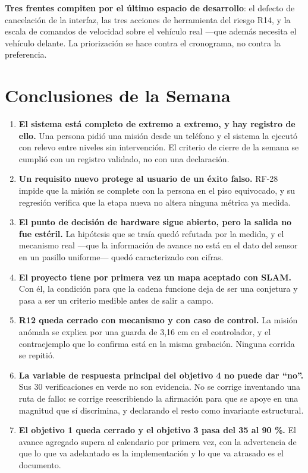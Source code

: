 \documentclass[12pt,letterpaper]{article}
\begin{document}
\textbf{Tres frentes compiten por el último espacio de desarrollo}: el defecto de cancelación de la interfaz, las tres acciones de herramienta del riesgo R14, y la escala de comandos de velocidad sobre el vehículo real ---que además necesita el vehículo delante. La priorización se hace contra el cronograma, no contra la preferencia.

\section{Conclusiones de la Semana}

\begin{enumerate}[leftmargin=*]
    \item \textbf{El sistema está completo de extremo a extremo, y hay registro de ello.} Una persona pidió una misión desde un teléfono y el sistema la ejecutó con relevo entre niveles sin intervención. El criterio de cierre de la semana se cumplió con un registro validado, no con una declaración.

    \item \textbf{Un requisito nuevo protege al usuario de un éxito falso.} RF-28 impide que la misión se complete con la persona en el piso equivocado, y su regresión verifica que la etapa nueva no altera ninguna métrica ya medida.

    \item \textbf{El punto de decisión de hardware sigue abierto, pero la salida no fue estéril.} La hipótesis que se traía quedó refutada por la medida, y el mecanismo real ---que la información de avance no está en el dato del sensor en un pasillo uniforme--- quedó caracterizado con cifras.

    \item \textbf{El proyecto tiene por primera vez un mapa aceptado con SLAM.} Con él, la condición para que la cadena funcione deja de ser una conjetura y pasa a ser un criterio medible antes de salir a campo.

    \item \textbf{R12 queda cerrado con mecanismo y con caso de control.} La misión anómala se explica por una guarda de 3,16 cm en el controlador, y el contraejemplo que lo confirma está en la misma grabación. Ninguna corrida se repitió.

    \item \textbf{La variable de respuesta principal del objetivo 4 no puede dar ``no''.} Sus 30 verificaciones en verde no son evidencia. No se corrige inventando una ruta de fallo: se corrige reescribiendo la afirmación para que se apoye en una magnitud que sí discrimina, y declarando el resto como invariante estructural.

    \item \textbf{El objetivo 1 queda cerrado y el objetivo 3 pasa del 35 al 90 \%.} El avance agregado supera al calendario por primera vez, con la advertencia de que lo que va adelantado es la implementación y lo que va atrasado es el documento.
\end{enumerate}
\end{document}
